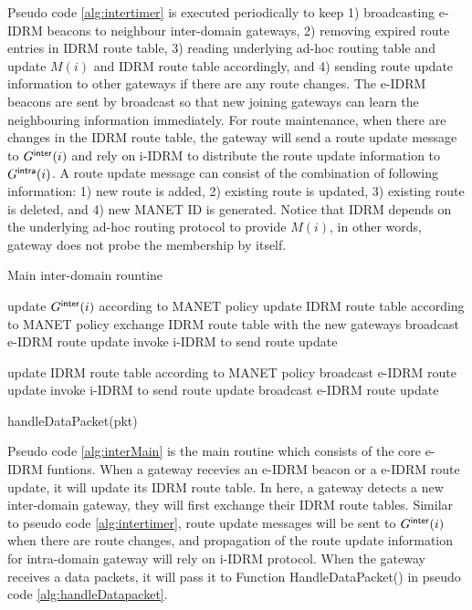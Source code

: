 Pseudo code \ref{alg:intertimer} is executed periodically to keep 
1) broadcasting e-IDRM beacons to neighbour inter-domain gateways,
2) removing expired route entries in IDRM route table, 
3) reading underlying ad-hoc routing table and update $M(i)$ and
IDRM route table accordingly, and 
4) sending route update information to other gateways if there are any route
changes. 
The e-IDRM beacons are sent by broadcast so that new joining gateways
can learn the neighbouring information immediately.
For route maintenance, when there are changes in the IDRM route table,
the gateway will send a route update message to $G^{\sf inter}(i)$ and
rely on i-IDRM to distribute the route update information to 
$G^{\sf intra}(i)$. 
A route update message can consist of the combination of
following information: 1) new route is added, 
2) existing route is updated, 
3) existing route is deleted, and 
4) new MANET ID is generated. 
Notice that IDRM depends on the underlying ad-hoc routing protocol to provide
$M(i)$, in other words, gateway does not probe the membership by itself. 

\begin{algorithm}[htb!]
\caption{Main inter-domain rountine}
\label{alg:interMain}
{\small
\begin{algorithmic}[1]
	\STATE update $G^{\sf inter}(i)$ according to MANET policy
	\STATE update IDRM route table according to MANET policy
	\STATE
		\STATE exchange IDRM route table with the new gateways
	\ENDIF
	\STATE
		\STATE broadcast e-IDRM route update
		\STATE invoke i-IDRM to send route update
	\ENDIF 
\ENDIF

\STATE 
{}
	\STATE update IDRM route table according to MANET policy
	\STATE
		\STATE broadcast e-IDRM route update
		\STATE invoke i-IDRM to send route update
	\ENDIF 
\ENDIF
\STATE
{}
	\STATE broadcast e-IDRM route update
\ENDIF 

\STATE
{}
	\STATE handleDataPacket(pkt)
\ENDIF
\end{algorithmic} 
}
\end{algorithm} 

Pseudo code \ref{alg:interMain} is the main routine which consists of the core
e-IDRM funtions. 
When a gateway recevies an e-IDRM beacon or a e-IDRM route update,
it will update its IDRM route table. 
In here, a gateway detects a new inter-domain gateway, 
they will first exchange their IDRM route tables.
Similar to pseudo code \ref{alg:intertimer}, 
route update messages will be sent to $G^{\sf inter}(i)$ 
when there are route changes, 
and propagation of the route update information for intra-domain gateway
will rely on i-IDRM protocol.
When the gateway receives a data packets, 
it will pass it to Function HandleDataPacket() 
in pseudo code \ref{alg:handleDatapacket}.
 
